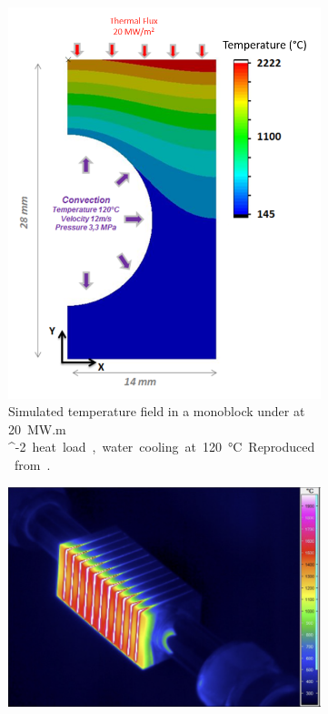 \begin{figure} [h]
    \centering
    \begin{subfigure}[t]{0.45\linewidth}
            \includegraphics[width=\linewidth]{Figures/Chapter1/alan_durif_monoblock.png}
            \caption{Simulated temperature field in a monoblock under at \SI{20}{MW.m ^{-2}} heat load, water cooling at \SI{120}{\celsius}. Reproduced from \cite{durif_modelisation_2019}.}
    \end{subfigure}\hfill%
    \begin{subfigure}[t]{0.45\linewidth}
            \includegraphics[width=\linewidth]{Figures/Chapter1/monoblock_experimental_temperature_field.png}

\end{subfigure}
\end{figure}
